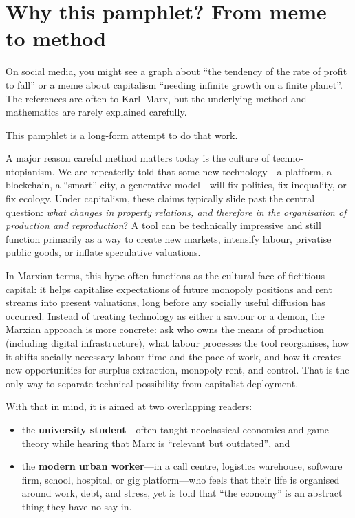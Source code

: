 
\section{Why this pamphlet? From meme to method}
\label{sec:intro-meme-method}

On social media, you might see a graph about ``the tendency of the rate of
profit to fall'' or a meme about capitalism ``needing infinite growth on a
finite planet''. The references are often to Karl~Marx, but the underlying
method and mathematics are rarely explained carefully.

This pamphlet is a long-form attempt to do that work.

A major reason careful method matters today is the culture of techno-utopianism.
We are repeatedly told that some new technology---a platform, a blockchain, a ``smart'' city,
a generative model---will fix politics, fix inequality, or fix ecology. Under capitalism,
these claims typically slide past the central question: \emph{what changes in property relations,
and therefore in the organisation of production and reproduction}? A tool can be technically impressive
and still function primarily as a way to create new markets, intensify labour, privatise public goods,
or inflate speculative valuations.

In Marxian terms, this hype often functions as the cultural face of fictitious capital: it helps capitalise expectations of future monopoly positions and rent streams into present valuations, long before any socially useful diffusion has occurred. Instead of treating technology as either a saviour or a demon, the Marxian approach is
more concrete: ask who owns the means of production (including digital infrastructure), what labour processes
the tool reorganises, how it shifts socially necessary labour time and the pace of work, and how it creates
new opportunities for surplus extraction, monopoly rent, and control. That is the only way to separate
technical possibility from capitalist deployment.

With that in mind, it is aimed at two overlapping readers:


\begin{itemize}[leftmargin=1.5em]
  \item the \textbf{university student}---often taught neoclassical economics
  and game theory while hearing that Marx is ``relevant but outdated'', and

  \item the \textbf{modern urban worker}---in a call centre, logistics
  warehouse, software firm, school, hospital, or gig platform---who feels
  that their life is organised around work, debt, and stress, yet is told
  that ``the economy'' is an abstract thing they have no say in.
\end{itemize}

